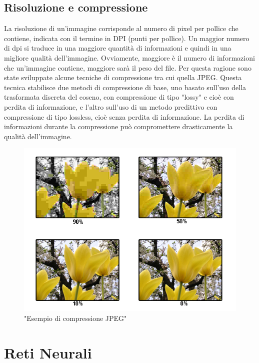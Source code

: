 \documentclass[a4paper,11pt]{article}
\begin{document}
    \subsection{Risoluzione e compressione}
    La risoluzione di un'immagine corrisponde al numero di pixel per pollice che contiene, indicata con il termine in DPI (punti per pollice). 
    Un maggior numero di dpi si traduce in una maggiore quantità di informazioni e quindi in una migliore qualità dell'immagine. 
    Ovviamente, maggiore è il numero di informazioni che un'immagine contiene, maggiore sarà il peso del file. 
    Per questa ragione sono state sviluppate alcune tecniche di compressione tra cui quella JPEG. Questa tecnica stabilisce due metodi di compressione di base,
    uno basato sull'uso della trasformata discreta del coseno, con compressione di tipo "lossy" e cioè con perdita di informazione, e l'altro sull'uso di un metodo predittivo
    con compressione di tipo lossless, cioè senza perdita di informazione. La perdita di informazioni durante la compressione può compromettere drasticamente la qualità dell'immagine.
    \begin{figure}[h]
        \centering
        \includegraphics[scale=0.7]{jpeg.png}
        \caption{"Esempio di compressione JPEG"}
    \end{figure}
   
    \newpage
    \section {Reti Neurali}
\end{document}

